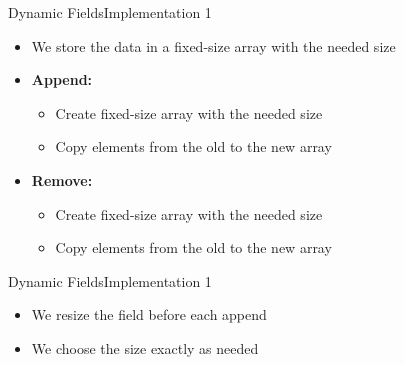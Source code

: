 \begin{frame}{Dynamic Fields}{Implementation 1}
  \begin{itemize}
    \item
      We store the data in a fixed-size array with the needed size
    \item
      \textbf{Append:}
      \begin{itemize}
        \item
          Create fixed-size array with the needed size
        \item
          Copy elements from the old to the new array
      \end{itemize}
    \item
      \textbf{Remove:}
      \begin{itemize}
        \item
          Create fixed-size array with the needed size
        \item
          Copy elements from the old to the new array
      \end{itemize}
  \end{itemize}
\end{frame}


\begin{frame}{Dynamic Fields}{Implementation 1}
  \begin{itemize}
    \item
      We resize the field before each append
    \item
      We choose the size exactly as needed
  \end{itemize}
\end{frame}





